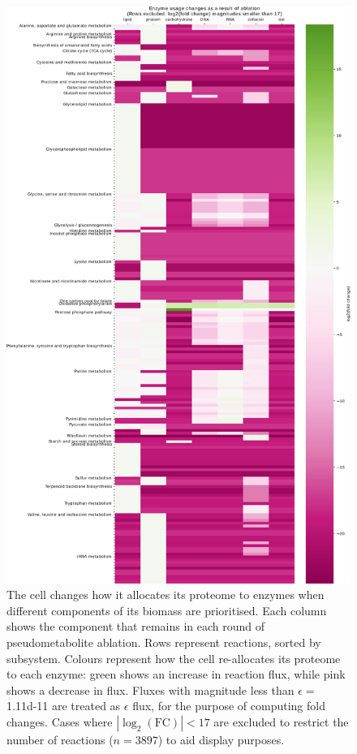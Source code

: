 \begin{figure}
  \centering
  \includegraphics[width=.8\linewidth]{allocation_fc}
  \caption{
    The cell changes how it allocates its proteome to enzymes when different components of its biomass are prioritised.
    Each column shows the component that remains in each round of pseudometabolite ablation.
    Rows represent reactions, sorted by subsystem.
    Colours represent how the cell re-allocates its proteome to each enzyme: green shows an increase in reaction flux, while pink shows a decrease in flux.
    Fluxes with magnitude less than $\epsilon = $ \SI{1.11d-11}{\mmolgdw} are treated as $\epsilon$ flux, for the purpose of computing fold changes.
    Cases where $|\log_{2}(\mathrm{FC})| < 17$ are excluded to restrict the number of reactions ($n = 3897$) to aid display purposes.
  }
  \label{fig:model-ablate-enz-use}
\end{figure}

